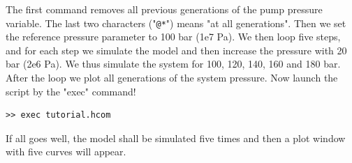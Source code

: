 \documentclass[a4paper,pdftex]{article}
\begin{document}
\begin{tutenumerate}
The first command removes all previous generations of the pump pressure variable. The last two characters ("\texttt{@*}") means "at all generations". Then we set the reference pressure parameter to 100 bar (1e7 Pa). We then loop five steps, and for each step we simulate the model and then increase the pressure with 20 bar (2e6 Pa). We thus simulate the system for 100, 120, 140, 160 and 180 bar. After the loop we plot all generations of the system pressure. Now launch the script by the "exec" command!

\vspace{5pt}\hspace{10pt}
\begin{minipage}{0.5\linewidth}
\begin{verbatim}
>> exec tutorial.hcom
\end{verbatim}
\end{minipage}
\vspace{5pt}

If all goes well, the model shall be simulated five times and then a plot window with five curves will appear.
\end{tutenumerate}

%
%
\end{document}
